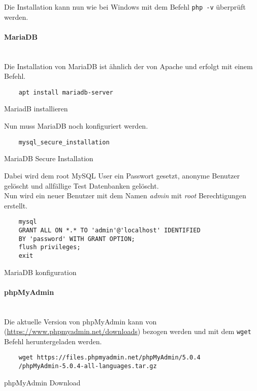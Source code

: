 Die Installation kann nun wie bei Windows mit dem Befehl \verb|php -v| überprüft werden.

\paragraph{MariaDB}\mbox{}\\

Die Installation von MariaDB ist ähnlich der von Apache und erfolgt mit einem Befehl.

\begin{listing}[H]
  \begin{verbatim}
    apt install mariadb-server
  \end{verbatim}
  \caption{MariadB installieren}
\end{listing}

Nun muss MariaDB noch konfiguriert werden.

\begin{listing}[H]
  \begin{verbatim}
    mysql_secure_installation
  \end{verbatim}
  \caption{MariaDB Secure Installation}
\end{listing}

Dabei wird dem root MySQL User ein Passwort gesetzt, anonyme Benutzer gelöscht
und allfällige Test Datenbanken gelöscht.\\

Nun wird ein neuer Benutzer mit dem Namen \textit{admin} mit \textit{root} Berechtigungen erstellt.

\begin{listing}[H]
  \begin{verbatim}
    mysql
    GRANT ALL ON *.* TO 'admin'@'localhost' IDENTIFIED 
    BY 'password' WITH GRANT OPTION;
    flush privileges;
    exit
  \end{verbatim}
  \caption{MariaDB konfiguration}
\end{listing}

\paragraph{phpMyAdmin}\mbox{}\\

Die aktuelle Version von phpMyAdmin kann von
(\url{https://www.phpmyadmin.net/downloads}) bezogen werden und mit dem
\verb|wget| Befehl heruntergeladen werden.

\begin{listing}[H]
  \begin{verbatim}
    wget https://files.phpmyadmin.net/phpMyAdmin/5.0.4
    /phpMyAdmin-5.0.4-all-languages.tar.gz
  \end{verbatim}
  \caption{phpMyAdmin Download}
\end{listing}

